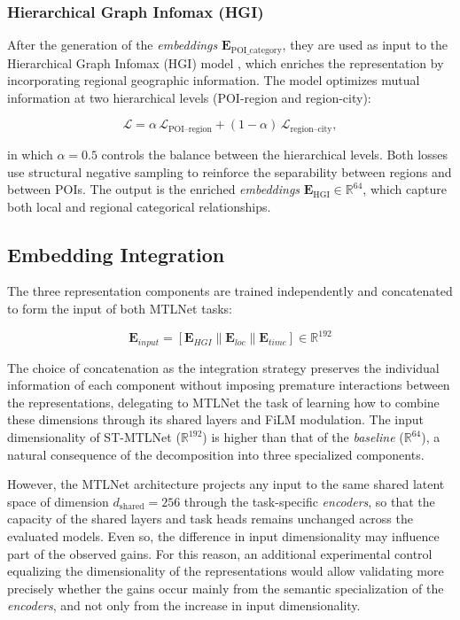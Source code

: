 \subsubsection{Hierarchical Graph Infomax (HGI)}

After the generation of the \textit{embeddings} $\mathbf{E}_{\text{POI\_category}}$, they are used as input to the Hierarchical Graph Infomax (HGI) model \cite{huang2023learning}, which enriches the representation by incorporating regional geographic information. The model optimizes mutual information at two hierarchical levels (POI-region and region-city):

\[
\mathcal{L}
=
\alpha\,\mathcal{L}_{\text{POI--region}}
+
(1-\alpha)\,\mathcal{L}_{\text{region--city}},
\]

in which $\alpha = 0.5$ controls the balance between the hierarchical levels. Both losses use structural negative sampling to reinforce the separability between regions and between POIs. The output is the enriched \textit{embeddings} $\mathbf{E}_{\text{HGI}} \in \mathbb{R}^{64}$, which capture both local and regional categorical relationships.



\subsection{Embedding Integration}

The three representation components are trained independently and concatenated to form the input of both MTLNet tasks:

\begin{equation}
\mathbf{E}_{input} = [\mathbf{E}_{HGI} \| \mathbf{E}_{loc} \| \mathbf{E}_{time}] \in \mathbb{R}^{192}
\label{eq:concat}
\end{equation}

The choice of concatenation as the integration strategy preserves the individual information of each component without imposing premature interactions between the representations, delegating to MTLNet the task of learning how to combine these dimensions through its shared layers and FiLM modulation. The input dimensionality of ST-MTLNet ($\mathbb{R}^{192}$) is higher than that of the \textit{baseline} ($\mathbb{R}^{64}$), a natural consequence of the decomposition into three specialized components.

However, the MTLNet architecture projects any input to the same shared latent space of dimension $d_{\mathrm{shared}} = 256$ through the task-specific \textit{encoders}, so that the capacity of the shared layers and task heads remains unchanged across the evaluated models. Even so, the difference in input dimensionality may influence part of the observed gains. For this reason, an additional experimental control equalizing the dimensionality of the representations would allow validating more precisely whether the gains occur mainly from the semantic specialization of the \textit{encoders}, and not only from the increase in input dimensionality.

